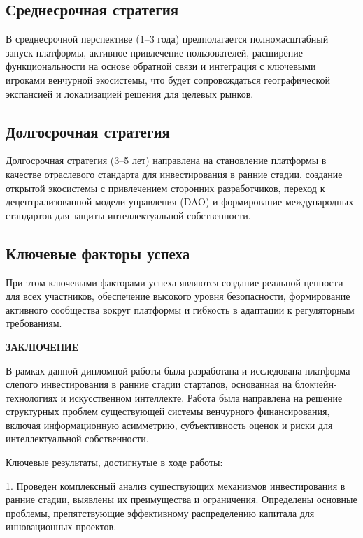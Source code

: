 \documentclass[
    candidate, %
    subf, %
    dotsinheaders=false,
]{disser}
\begin{document}
\subsection{Среднесрочная стратегия}
В среднесрочной перспективе (1–3 года) предполагается полномасштабный запуск платформы, активное привлечение пользователей, расширение функциональности на основе обратной связи и интеграция с ключевыми игроками венчурной экосистемы, что будет сопровождаться географической экспансией и локализацией решения для целевых рынков.

\subsection{Долгосрочная стратегия}
Долгосрочная стратегия (3–5 лет) направлена на становление платформы в качестве отраслевого стандарта для инвестирования в ранние стадии, создание открытой экосистемы с привлечением сторонних разработчиков, переход к децентрализованной модели управления (DAO) и формирование международных стандартов для защиты интеллектуальной собственности.

\subsection{Ключевые факторы успеха}
При этом ключевыми факторами успеха являются создание реальной ценности для всех участников, обеспечение высокого уровня безопасности, формирование активного сообщества вокруг платформы и гибкость в адаптации к регуляторным требованиям.


\newpage
\begin{center}
  \textbf{ЗАКЛЮЧЕНИЕ}
\end{center}

В рамках данной дипломной работы была разработана и исследована платформа слепого инвестирования в ранние стадии стартапов, основанная на блокчейн-технологиях и искусственном интеллекте. Работа была направлена на решение структурных проблем существующей системы венчурного финансирования, включая информационную асимметрию, субъективность оценок и риски для интеллектуальной собственности.

Ключевые результаты, достигнутые в ходе работы:

1. Проведен комплексный анализ существующих механизмов инвестирования в ранние стадии, выявлены их преимущества и ограничения. Определены основные проблемы, препятствующие эффективному распределению капитала для инновационных проектов.
\end{document}
